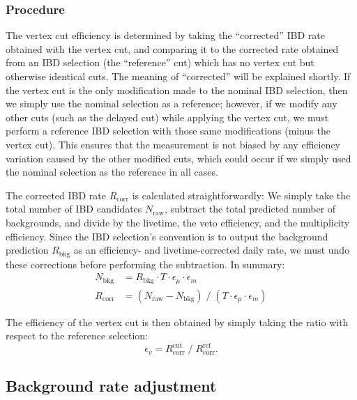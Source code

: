 \documentclass[../thesis.tex]{subfiles}
\begin{document}
\begin{comment}
  TODO Try doing vertex efficiency with background subtraction. Oh wait we already do.
\end{comment}

\subsubsection{Procedure}
\label{sec:cutVaryVtxCutProc}

The vertex cut efficiency is determined by taking the ``corrected'' IBD rate obtained with the vertex cut, and comparing it to the corrected rate obtained from an IBD selection (the ``reference'' cut) which has no vertex cut but otherwise identical cuts. The meaning of ``corrected'' will be explained shortly. If the vertex cut is the only modification made to the nominal IBD selection, then we simply use the nominal selection as a reference; however, if we modify any other cuts (such as the delayed cut) while applying the vertex cut, we must perform a reference IBD selection with those same modifications (minus the vertex cut). This ensures that the measurement is not biased by any efficiency variation caused by the other modified cuts, which could occur if we simply used the nominal selection as the reference in all cases.

The corrected IBD rate $R_{\mathrm{corr}}$ is calculated straightforwardly: We simply take the total number of IBD candidates $N_{\mathrm{raw}}$, subtract the total predicted number of backgrounds, and divide by the livetime, the veto efficiency, and the multiplicity efficiency. Since the IBD selection's convention is to output the background prediction $R_{\mathrm{bkg}}$ as an efficiency- and livetime-corrected daily rate, we must undo these corrections before performing the subtraction. In summary:
\begin{align*}
  N_{\mathrm{bkg}} &= R_{\mathrm{bkg}} \cdot T \cdot \epsilon_\mu \cdot \epsilon_m\\
  R_{\mathrm{corr}} &= (N_{\mathrm{raw}} - N_{\mathrm{bkg}}) \;/\; (T \cdot \epsilon_\mu \cdot \epsilon_m)
\end{align*}

The efficiency of the vertex cut is then obtained by simply taking the ratio with respect to the reference selection:
$$ \epsilon_v = R_{\mathrm{corr}}^{\mathrm{cut}} \;/\; R_{\mathrm{corr}}^{\mathrm{ref}}. $$

\subsection{Background rate adjustment}
\label{sec:cutVaryVtxCutBkgRate}
\end{document}
